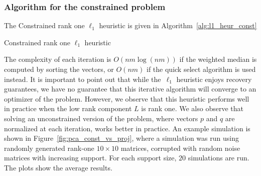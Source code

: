 \subsubsection{Algorithm for the constrained problem} 
The Constrained rank one $\ell_1$ heuristic is given in Algorithm~\ref{alg:l1_heur_const}
\begin{algorithm}[h]
\caption{Constrained rank one $\ell_1$ heuristic}
\label{alg:l1_heur_const}
\end{algorithm}

The complexity of each iteration is $O(nm\log (nm))$ if the weighted median is computed by sorting the vectors, or $O(nm)$ if the quick select algorithm is used instead. 
It is important to point out that while the~$\ell_1$ heuristic enjoys recovery guarantees, we have no guarantee that this iterative algorithm will converge to an optimizer of the problem. However, we observe that this heuristic performs well in practice when the low rank component $L$ is rank one. We also observe that solving an unconstrained version of the problem, where vectors $p$ and $q$ are normalized at each iteration, works better in practice. An example simulation is shown in Figure~\ref{fig:pca_const_vs_proj}, where a simulation was run using randomly generated rank-one $10 \times 10$ matrices, corrupted with random noise matrices with increasing support. For each support size, $20$ simulations are run. The plots show the average results.

